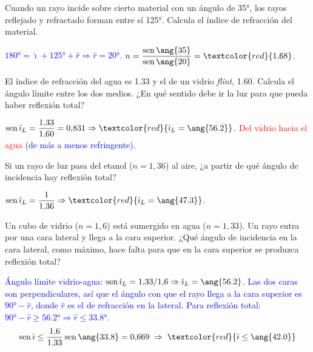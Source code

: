 \begin{exercise}
    Cuando un rayo incide sobre cierto material con un ángulo de \ang{35}, los rayos reflejado y refractado forman entre sí
    \ang{125}. Calcula el índice de refracción del material.
    \begin{solu}
        \textcolor{blue}{\(\ang{180} = \hat{\imath} + \ang{125} + \hat r \Rightarrow \hat r = \ang{20}\).}
        \(n = \dfrac{\sen\ang{35}}{\sen\ang{20}} = \textcolor{red}{1{,}68}\).
    \end{solu}
\end{exercise}

\begin{exercise}
    El índice de refracción del agua es \num{1.33} y el de un vidrio \emph{flint}, \num{1.60}. Calcula el ángulo límite entre
    los dos medios. ¿En qué sentido debe ir la luz para que pueda haber reflexión total?
    \begin{solu}
        \(\sen\hat{\imath}_L = \dfrac{1{,}33}{1{,}60} = 0{,}831 \Rightarrow \textcolor{red}{\hat{\imath}_L = \ang{56.2}}\).
        \textcolor{red}{Del vidrio hacia el agua} \textcolor{blue}{(de más a menos refringente).}
    \end{solu}
\end{exercise}

\begin{exercise}
    Si un rayo de luz pasa del etanol (\(n = 1{,}36\)) al aire, ¿a partir de qué ángulo de incidencia hay reflexión total?
    \begin{solu}
        \(\sen\hat{\imath}_L = \dfrac{1}{1{,}36} \Rightarrow \textcolor{red}{\hat{\imath}_L = \ang{47.3}}\).
    \end{solu}
\end{exercise}

\begin{exercise}
    Un cubo de vidrio (\(n = 1{,}6\)) está sumergido en agua (\(n = 1{,}33\)). Un rayo entra por una cara lateral y llega a
    la cara superior. ¿Qué ángulo de incidencia en la cara lateral, como máximo, hace falta para que en la cara superior se
    produzca reflexión total?
    \begin{solu}
        \textcolor{blue}{Ángulo límite vidrio-agua: \(\sen\hat{\imath}_L = 1{,}33/1{,}6 \Rightarrow \hat{\imath}_L = \ang{56.2}\).
        Las dos caras son perpendiculares, así que el ángulo con que el rayo llega a la cara superior es \(\ang{90} - \hat r\),
        donde \(\hat r\) es el de refracción en la lateral. Para reflexión total: \(\ang{90} - \hat r \geq \ang{56.2} \Rightarrow \hat r \leq \ang{33.8}\).}
        \[ \sen\hat{\imath} \leq \dfrac{1{,}6}{1{,}33}\sen\ang{33.8} = 0{,}669 \;\Rightarrow\; \textcolor{red}{\hat{\imath} \leq \ang{42.0}} \]
    \end{solu}
\end{exercise}

